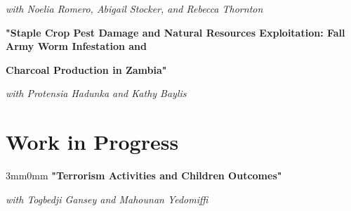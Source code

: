 \documentclass[letterpaper,11pt]{article}
\begin{document}
\hspace{0.5mm}
\textit{with Noelia Romero, Abigail Stocker, and Rebecca Thornton}
\vspace{0.5mm}
 

\vspace{3mm}
\hspace{-3mm}
\textbf{"Staple Crop Pest Damage and Natural Resources Exploitation: Fall Army Worm Infestation and}

\hspace{-2mm}
\textbf{Charcoal Production in Zambia"} 

\hspace{0.5mm}
\textit{with Protensia Hadunka and Kathy Baylis}

\section{Work in Progress}

\begin{adjustwidth}{3mm}{0mm}
\textbf{"Terrorism Activities and Children Outcomes"} 

\hspace{0.25mm}
\textit{with Togbedji Gansey and Mahounan Yedomiffi}
\end{adjustwidth}
\end{document}
